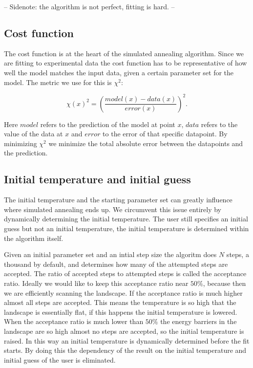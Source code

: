 -- Sidenote: the algorithm is not perfect, fitting is hard. --


\subsection{Cost function}

The cost function is at the heart of the simulated annealing algorithm. Since we are fitting to experimental data the cost function has to be representative of how well the model matches the input data, given a certain parameter set for the model. The metric we use for this is $\chi^2$:

\begin{equation}
\chi (x)^2 = \left( \frac{model(x)-data(x)}{error(x)} \right)^2.
\end{equation}

Here $model$ refers to the prediction of the model at point $x$, $data$ refers to the value of the data at $x$ and $error$ to the error of that specific datapoint. By minimizing $\chi^2$ we minimize the total absolute error between the datapoints and the prediction.


\subsection{Initial temperature and initial guess}

The initial temperature and the starting parameter set can greatly influence where simulated annealing ends up. We circumvent this issue entirely by dynamically determining the initial temperature. The user still specifies an initial guess but not an initial temperature, the initial temperature is determined within the algorithm itself.

Given an initial parameter set and an intial step size the algoritm does $N$ steps, a thousand by default, and determines how many of the attempted steps are accepted. The ratio of accepted steps to attempted steps is called the acceptance ratio. Ideally we would like to keep this acceptance ratio near $50\%$, because then we are efficiently scanning the landscape. If the acceptance ratio is much higher almost all steps are accepted. This means the temperature is so high that the landscape is essentially flat, if this happens the initial temperature is lowered. When the acceptance ratio is much lower than $50\%$ the energy barriers in the landscape are so high almost no steps are accepted, so the initial temperature is raised. In this way an initial temperature is dynamically determined before the fit starts. By doing this the dependency of the result on the initial temperature and initial guess of the user is eliminated.

